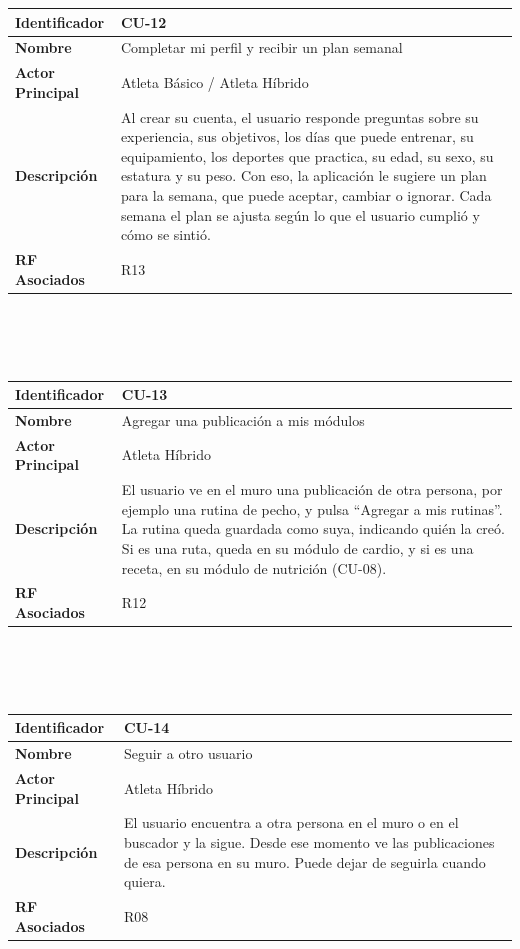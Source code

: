 \newpage
\begin{tabular}{|p{3.5cm}|p{11.5cm}|}
    \hline
    \rowcolor[HTML]{EFEFEF}
    \textbf{Identificador} & \textbf{CU-12} \\ \hline
    \textbf{Nombre} & Completar mi perfil y recibir un plan semanal \\ \hline
    \textbf{Actor Principal} & Atleta Básico / Atleta Híbrido \\ \hline
    \textbf{Descripción} & Al crear su cuenta, el usuario responde preguntas sobre su experiencia, sus objetivos, los días que puede entrenar, su equipamiento, los deportes que practica, su edad, su sexo, su estatura y su peso. Con eso, la aplicación le sugiere un plan para la semana, que puede aceptar, cambiar o ignorar. Cada semana el plan se ajusta según lo que el usuario cumplió y cómo se sintió. \\ \hline
    \textbf{RF Asociados} & R13 \\ \hline
\end{tabular}
\\\\\\
\begin{tabular}{|p{3.5cm}|p{11.5cm}|}
    \hline
    \rowcolor[HTML]{EFEFEF}
    \textbf{Identificador} & \textbf{CU-13} \\ \hline
    \textbf{Nombre} & Agregar una publicación a mis módulos \\ \hline
    \textbf{Actor Principal} & Atleta Híbrido \\ \hline
    \textbf{Descripción} & El usuario ve en el muro una publicación de otra persona, por ejemplo una rutina de pecho, y pulsa ``Agregar a mis rutinas''. La rutina queda guardada como suya, indicando quién la creó. Si es una ruta, queda en su módulo de cardio, y si es una receta, en su módulo de nutrición (CU-08). \\ \hline
    \textbf{RF Asociados} & R12 \\ \hline
\end{tabular}
\\\\\\
\begin{tabular}{|p{3.5cm}|p{11.5cm}|}
    \hline
    \rowcolor[HTML]{EFEFEF}
    \textbf{Identificador} & \textbf{CU-14} \\ \hline
    \textbf{Nombre} & Seguir a otro usuario \\ \hline
    \textbf{Actor Principal} & Atleta Híbrido \\ \hline
    \textbf{Descripción} & El usuario encuentra a otra persona en el muro o en el buscador y la sigue. Desde ese momento ve las publicaciones de esa persona en su muro. Puede dejar de seguirla cuando quiera. \\ \hline
    \textbf{RF Asociados} & R08 \\ \hline
\end{tabular}
